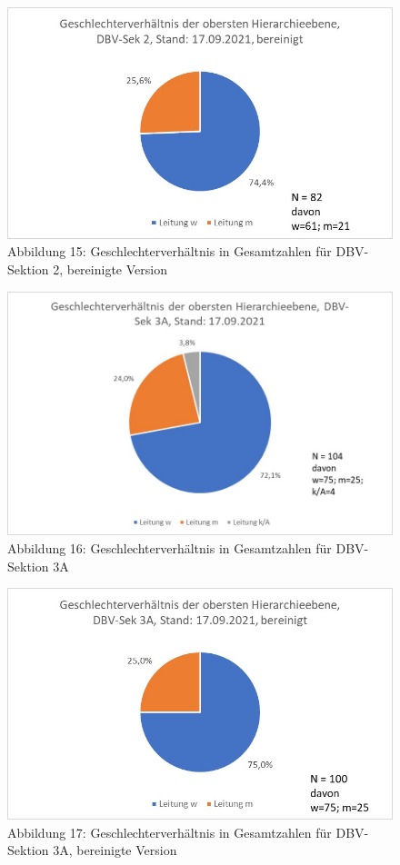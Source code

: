 \documentclass[a4paper,
fontsize=11pt,
oneside,
numbers=noperiodatend,
parskip=half-,
bibliography=totoc,
final
]{scrartcl}
\begin{document}
\begin{figure}
\centering
\includegraphics{img/Abb.15_DBV-Sek2_gesamt_bereinigt.jpg}
\caption{Abbildung 15: Geschlechterverhältnis in Gesamtzahlen für
DBV-Sektion 2, bereinigte Version}
\end{figure}

\begin{figure}
\centering
\includegraphics{img/Abb.16_DBV-Sek3A_gesamt.jpg}
\caption{Abbildung 16: Geschlechterverhältnis in Gesamtzahlen für
DBV-Sektion 3A}
\end{figure}

\begin{figure}
\centering
\includegraphics{img/Abb.17_DBV-Sek3A_gesamt_bereinigt.jpg}
\caption{Abbildung 17: Geschlechterverhältnis in Gesamtzahlen für
DBV-Sektion 3A, bereinigte Version}
\end{figure}
\end{document}
